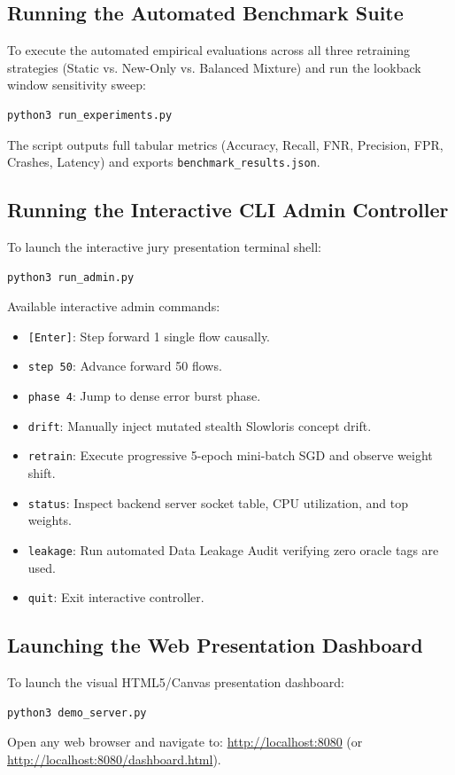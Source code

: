\documentclass[12pt,a4paper,oneside]{report}
\begin{document}
\subsection{Running the Automated Benchmark Suite}
To execute the automated empirical evaluations across all three retraining strategies (Static vs. New-Only vs. Balanced Mixture) and run the lookback window sensitivity sweep:
\begin{lstlisting}[language=bash]
python3 run_experiments.py
\end{lstlisting}
The script outputs full tabular metrics (Accuracy, Recall, FNR, Precision, FPR, Crashes, Latency) and exports \texttt{benchmark\_results.json}.

\subsection{Running the Interactive CLI Admin Controller}
To launch the interactive jury presentation terminal shell:
\begin{lstlisting}[language=bash]
python3 run_admin.py
\end{lstlisting}
Available interactive admin commands:
\begin{itemize}
    \item \texttt{[Enter]}: Step forward 1 single flow causally.
    \item \texttt{step 50}: Advance forward 50 flows.
    \item \texttt{phase 4}: Jump to dense error burst phase.
    \item \texttt{drift}: Manually inject mutated stealth Slowloris concept drift.
    \item \texttt{retrain}: Execute progressive 5-epoch mini-batch SGD and observe weight shift.
    \item \texttt{status}: Inspect backend server socket table, CPU utilization, and top weights.
    \item \texttt{leakage}: Run automated Data Leakage Audit verifying zero oracle tags are used.
    \item \texttt{quit}: Exit interactive controller.
\end{itemize}

\subsection{Launching the Web Presentation Dashboard}
To launch the visual HTML5/Canvas presentation dashboard:
\begin{lstlisting}[language=bash]
python3 demo_server.py
\end{lstlisting}
Open any web browser and navigate to:
\url{http://localhost:8080} (or \url{http://localhost:8080/dashboard.html}).
\end{document}
